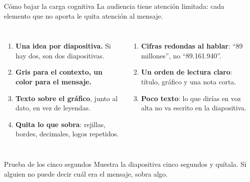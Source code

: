 \documentclass[aspectratio=169,11pt]{beamer}
\begin{document}
\begin{frame}[t]{Cómo bajar la carga cognitiva}
  \small La audiencia tiene atención limitada: cada elemento que no aporta
  le quita atención al mensaje.
  \vspace{0.1cm}
  \begin{columns}[T,onlytextwidth]
    \begin{enumerate}
      \footnotesize
      \item \textbf{Una idea por diapositiva.} Si hay dos, son dos
        diapositivas.
      \item \textbf{Gris para el contexto, un color para el mensaje.}
      \item \textbf{Texto sobre el gráfico}, junto al dato, en vez de
        leyendas.
      \item \textbf{Quita lo que sobra}: rejillas, bordes, decimales,
        logos repetidos.
    \end{enumerate}
    \begin{enumerate}
      \footnotesize
      \setcounter{enumi}{4}
      \item \textbf{Cifras redondas al hablar}: ``89 millones'', no
        ``89.161.940''.
      \item \textbf{Un orden de lectura claro}: título, gráfico y una nota
        corta.
      \item \textbf{Poco texto}: lo que dirías en voz alta no va escrito en
        la diapositiva.
    \end{enumerate}
  \end{columns}
  \vspace{0.15cm}
  \begin{block}{Prueba de los cinco segundos}
    \footnotesize Muestra la diapositiva cinco segundos y quítala. Si
    alguien no puede decir cuál era el mensaje, sobra algo.
  \end{block}
\end{frame}
\end{document}
